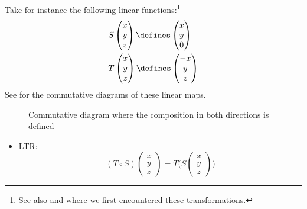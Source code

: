 \begin{exm}\label{exm-linear-composition:3}
	Take for instance the following linear functions:\footnote{See also 
		and  where we first encountered
		these transformations.}
	\begin{align*}
		 & S\begin{pmatrix}
			x \\ y \\ z
		\end{pmatrix}\defines\begin{pmatrix}
			x \\ y \\ 0
		\end{pmatrix} \\
		 & T\begin{pmatrix}
			x \\ y \\ z
		\end{pmatrix}\defines\begin{pmatrix}
			-x \\ y \\ z
		\end{pmatrix}
	\end{align*}
	See  for the commutative
	diagrams of these linear maps.
	\begin{figure}[ht!]
		\centering
		\caption{Commutative diagram where the composition in both directions is defined}
		\label{commutative-diagram:linear-composition:3}
	\end{figure}
	\begin{itemize}
		\item LTR:
		      \begin{equation*}
			      (T \circ S)\begin{pmatrix}
				      x \\ y \\ z
			      \end{pmatrix}=T\Bigg(S\begin{pmatrix}
				      x \\ y \\ z
			      \end{pmatrix}\Bigg)

\end{equation*}
\end{itemize}
\end{exm}
